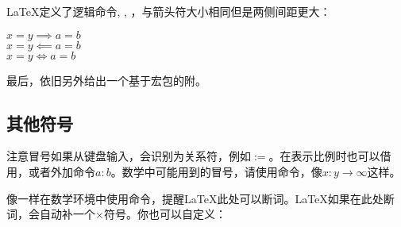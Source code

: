\LaTeX 定义了逻辑命令, , ，与箭头符大小相同但是两侧间距更大：
\begin{codeshow}
$x=y \implies a=b$\\
$x=y \impliedby a=b$\\
$x=y \iff a=b$
\end{codeshow}

最后，依旧另外给出一个基于宏包的附。
\begin{table}[!htb]
\centering
\caption{amssymb箭头}
\label{tab:amsarrow}
\renewcommand\arraystretch{1}
\end{table}

\subsection{其他符号}
注意冒号如果从键盘输入，会识别为关系符，例如$:=$。在表示比例时也可以借用，或者外加命令$a\mathbin{:}b$。数学中可能用到的冒号，请使用命令，像$x\colon y\to\infty$这样。

像\latexline{\-}一样在数学环境中使用\latexline{*}命令，提醒\LaTeX 此处可以断词。\LaTeX 如果在此处断词，会自动补一个$\times$符号。你也可以自定义：
\begin{latex}
\renewcommand{\*}{discretionaty{\,\mbox{$\cdot$}}{}{}}
\end{latex}


